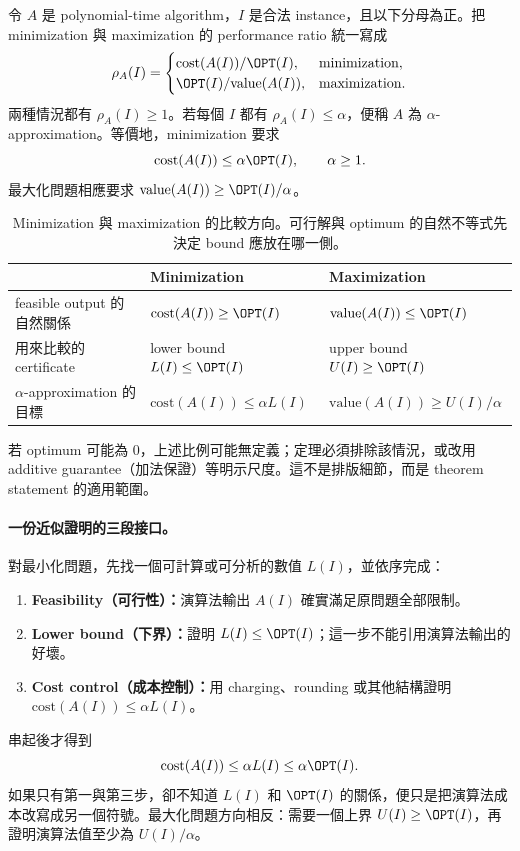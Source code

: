 \documentclass[11pt,a4paper,oneside,openany]{book}
\begin{document}
\begin{definition}
令 $A$ 是 polynomial-time algorithm，$I$ 是合法 instance，且以下分母為正。把 minimization 與 maximization 的 performance ratio 統一寫成
\[
 \rho_A(I)=
 \begin{cases}
 \mathrm{cost}(A(I))/\OPT(I),&\text{minimization},\\
 \OPT(I)/\mathrm{value}(A(I)),&\text{maximization}.
 \end{cases}
\]
兩種情況都有 $\rho_A(I)\ge1$。若每個 $I$ 都有 $\rho_A(I)\le\alpha$，便稱 $A$ 為 $\alpha$-approximation。等價地，minimization 要求
\[
 \mathrm{cost}(A(I))\le\alpha\OPT(I),\qquad \alpha\ge1.
\]
最大化問題相應要求 $\mathrm{value}(A(I))\ge\OPT(I)/\alpha$。
\end{definition}

\begin{table}[htbp]
\centering
\caption{Minimization 與 maximization 的比較方向。可行解與 optimum 的自然不等式先決定 bound 應放在哪一側。}
\label{tab:approx-direction}
\begin{tabularx}{\textwidth}{@{}lXX@{}}
\toprule
 & Minimization & Maximization \\
\midrule
feasible output 的自然關係
  & $\mathrm{cost}(A(I))\ge\OPT(I)$
  & $\mathrm{value}(A(I))\le\OPT(I)$ \\
用來比較的 certificate
  & lower bound $L(I)\le\OPT(I)$
  & upper bound $U(I)\ge\OPT(I)$ \\
$\alpha$-approximation 的目標
  & $\mathrm{cost}(A(I))\le\alpha L(I)$
  & $\mathrm{value}(A(I))\ge U(I)/\alpha$ \\
\bottomrule
\end{tabularx}
\end{table}

若 optimum 可能為 0，上述比例可能無定義；定理必須排除該情況，或改用 additive guarantee（加法保證）等明示尺度。這不是排版細節，而是 theorem statement 的適用範圍。

\paragraph{一份近似證明的三段接口。}
對最小化問題，先找一個可計算或可分析的數值 $L(I)$，並依序完成：
\begin{enumerate}
  \item \textbf{Feasibility（可行性）：}演算法輸出 $A(I)$ 確實滿足原問題全部限制。
  \item \textbf{Lower bound（下界）：}證明 $L(I)\le\OPT(I)$；這一步不能引用演算法輸出的好壞。
  \item \textbf{Cost control（成本控制）：}用 charging、rounding 或其他結構證明 $\mathrm{cost}(A(I))\le\alpha L(I)$。
\end{enumerate}
串起後才得到
\[
 \mathrm{cost}(A(I))\le\alpha L(I)\le\alpha\OPT(I).
\]
如果只有第一與第三步，卻不知道 $L(I)$ 和 $\OPT(I)$ 的關係，便只是把演算法成本改寫成另一個符號。最大化問題方向相反：需要一個上界 $U(I)\ge\OPT(I)$，再證明演算法值至少為 $U(I)/\alpha$。
\end{document}
